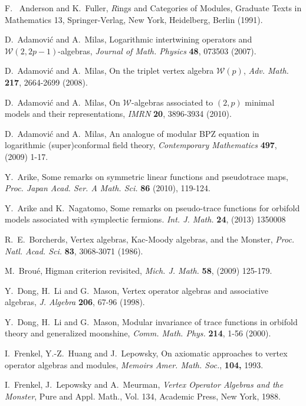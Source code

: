 \documentclass[12pt]{article}
\begin{document}
\begin{thebibliography}{FGST2}

 F.~ Anderson and K.~Fuller, {\emph Rings and Categories
of Modules}, Graduate Texts in Mathematics 13, Springer-Verlag,
New York, Heidelberg, Berlin (1991).

 D.~Adamovi\'c and A.~Milas, Logarithmic intertwining
operators and $\mathcal W(2, 2p-1)$-algebras, {\em Journal of Math.
Physics} {\bf 48}, 073503 (2007).

 D.~Adamovi\'c and A.~Milas, On the triplet vertex
  algebra $\mathcal W(p)$, {\em Adv. Math.} {\bf 217}, 2664-2699 (2008).

 D.~Adamovi\'c and A.~Milas, On $\mathcal W$-algebras
associated to $(2,p)$ minimal models and their representations,
{\em IMRN} {\bf 20}, 3896-3934 (2010).

 D.~Adamovi\'c and A.~Milas, An analogue of modular BPZ
equation in logarithmic (super)conformal field theory,
{\em Contemporary Mathematics} {\bf 497}, (2009) 1-17. 

 Y.~Arike, Some remarks on symmetric linear functions
and pseudotrace maps, {\em Proc. Japan Acad. Ser. A Math. Sci.} {\bf 86}
(2010), 119-124.

 Y.~Arike and K.~Nagatomo, Some remarks on pseudo-trace 
functions for orbifold models associated with symplectic fermions.
{\em Int. J. Math.} {\bf 24}, (2013) 1350008 

 R.~E.~Borcherds, Vertex algebras, Kac-Moody algebras, and the
  Monster, {\em Proc. Natl. Acad. Sci.} {\bf 83}, 3068-3071 (1986).

 M.~Brou\'e, Higman criterion revisited, {\em Mich. J.
Math.} {\bf 58}, (2009) 125-179.

 Y.~Dong, H.~Li and G.~Mason, Vertex operator
algebras and associative algebras, {\em J. Algebra} {\bf 206}, 67-96
(1998).

 Y.~Dong, H.~Li and G.~Mason, Modular invariance
of trace functions in orbifold theory and generalized moonshine,
{\em Comm. Math. Phys.} {\bf 214}, 1-56 (2000).

 I.~Frenkel, Y.-Z.~Huang and J.~Lepowsky, On axiomatic
approaches to vertex operator algebras and modules, {\em Memoirs
Amer. Math. Soc.}, {\bf 104,} 1993.

 I.~Frenkel, J.~Lepowsky and A.~Meurman, {\em Vertex
Operator Algebras and the Monster}, Pure and Appl. Math., Vol. 134,
Academic Press, New York, 1988.


\end{thebibliography}
\end{document}
